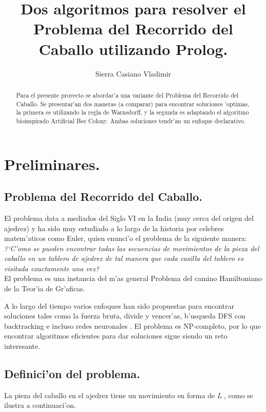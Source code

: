 \documentclass[12pt]{article}
\title{ Dos algoritmos para resolver el Problema del Recorrido del Caballo
    utilizando Prolog.}
\author{Sierra Casiano Vladimir}
\begin{document}
    \maketitle

    \begin{abstract}
        Para el presente proyecto se abordar'a una variante del Problema del Recorrido del
        Caballo.
        Se presentar'an dos maneras (a comparar) para encontrar soluciones
        'optimas, la primera es utilizando la regla de Warnsdorff, y la segunda
        es adaptando el algoritmo bioinspirado Artificial Bee Colony. Ambas
        soluciones tendr'an un enfoque declarativo.
    \end{abstract}


    \section{Preliminares.}

    \subsection{Problema del Recorrido del Caballo.}


    El problema data a mediados del Siglo VI en la India \cite{watkins} (muy cerca del
    origen del ajedrez) y ha sido muy estudiado a lo largo de la historia por
    celebres matem'aticos como
    Euler, quien enunci'o el problema de la siguiente manera:
    \textit{ ?`C'omo se pueden encontrar todas las secuencias de movimientos de
    la pieza del caballo en un tablero de ajedrez de tal manera que cada casilla del
    tablero es visitada exactamente una vez?
    }  \cite{golumbic2021} \\
    El problema es una instancia del m'as general
    Problema del camino Hamiltoniano de la  Teor'ia de Gr'aficas.

    A lo largo del tiempo varios enfoques han sido propuestas para
    encontrar soluciones tales como la fuerza bruta, divide y vencer'as,
    b'usqueda DFS con backtracking e incluso redes neuronales \cite{anan}.
    El problema es NP-completo, por lo que encontrar algoritmos eficientes
    para dar soluciones sigue siendo un reto interesante.



    \subsection{Definici'on del problema.}
    La pieza del caballo en el ajedrez tiene un movimiento en forma de \textit{L} , como
    se ilustra a continuaci'on.
    
\end{document}
